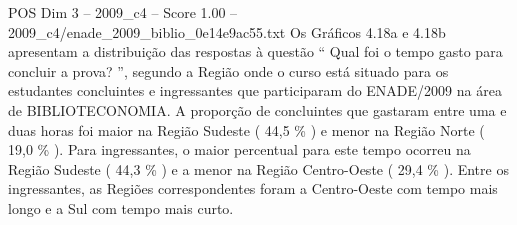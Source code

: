 \begin{textsample}{POS Dim 3 – 2009\_c4 – Score 1.00 – 2009\_c4/enade\_2009\_biblio\_0e14e9ac55.txt}
Os Gráficos 4.18a e 4.18b apresentam a distribuição das respostas à questão “ Qual foi o tempo gasto para concluir a prova? ”, segundo a Região onde o curso está situado para os estudantes concluintes e ingressantes que participaram do ENADE/2009 na área de BIBLIOTECONOMIA.
A proporção de concluintes que gastaram entre uma e duas horas foi maior na Região Sudeste ( 44,5 \% ) e menor na Região Norte ( 19,0 \% ).
Para ingressantes, o maior percentual para este tempo ocorreu na Região Sudeste ( 44,3 \% ) e a menor na Região Centro-Oeste ( 29,4 \% ).
Entre os ingressantes, as Regiões correspondentes foram a Centro-Oeste com tempo mais longo e a Sul com tempo mais curto.

\end{textsample}
